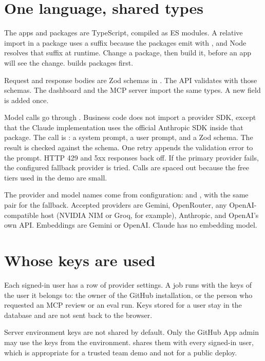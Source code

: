 \section{One language, shared types}

The apps and packages are TypeScript, compiled as ES modules. A relative import in a package uses a  suffix because the packages emit  with , and Node resolves that suffix at runtime. Change a package, then build it, before an app will see the change.  builds packages first.

Request and response bodies are Zod schemas in . The API validates with those schemas. The dashboard and the MCP server import the same types. A new field is added once.

Model calls go through . Business code does not import a provider SDK, except that the Claude implementation uses the official Anthropic SDK inside that package. The call is : a system prompt, a user prompt, and a Zod schema. The result is checked against the schema. One retry appends the validation error to the prompt. HTTP 429 and 5xx responses back off. If the primary provider fails, the configured fallback provider is tried. Calls are spaced out because the free tiers used in the demo are small.

The provider and model names come from configuration:  and , with the same pair for the fallback. Accepted providers are Gemini, OpenRouter, any OpenAI-compatible host (NVIDIA NIM or Groq, for example), Anthropic, and OpenAI's own API. Embeddings are Gemini or OpenAI. Claude has no embedding model.

\section{Whose keys are used}

Each signed-in user has a row of provider settings. A job runs with the keys of the user it belongs to: the owner of the GitHub installation, or the person who requested an MCP review or an eval run. Keys stored for a user stay in the database and are not sent back to the browser.

Server environment keys are not shared by default. Only the GitHub App admin may use the keys from the environment.  shares them with every signed-in user, which is appropriate for a trusted team demo and not for a public deploy.

